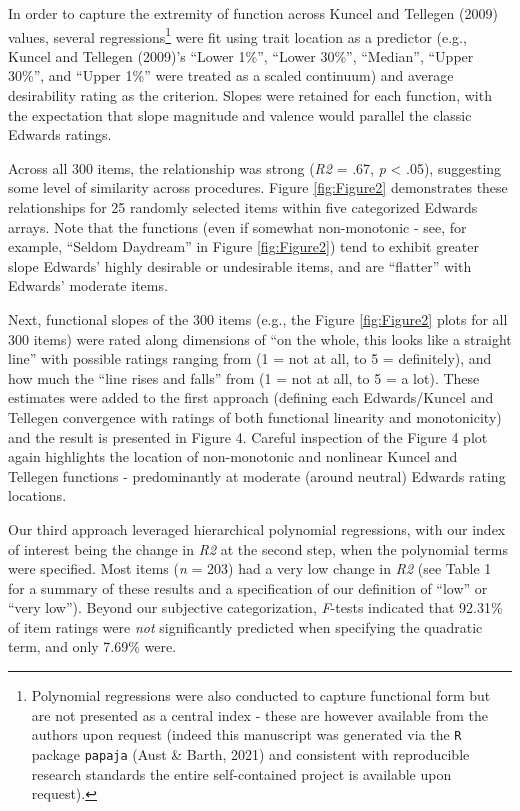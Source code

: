 \documentclass[
  ,man]{apa6}
\begin{document}
In order to capture the extremity of function across Kuncel and Tellegen (2009) values, several regressions\footnote{Polynomial regressions were also conducted to capture functional form but are not presented as a central index - these are however available from the authors upon request (indeed this manuscript was generated via the \texttt{R} package \texttt{papaja} (Aust \& Barth, 2021) and consistent with reproducible research standards the entire self-contained project is available upon request).} were fit using trait location as a predictor (e.g., Kuncel and Tellegen (2009)'s ``Lower 1\%'', ``Lower 30\%'', ``Median'', ``Upper 30\%'', and ``Upper 1\%'' were treated as a scaled continuum) and average desirability rating as the criterion. Slopes were retained for each function, with the expectation that slope magnitude and valence would parallel the classic Edwards ratings.

Across all 300 items, the relationship was strong (\emph{R2} = .67, \emph{p} \textless{} .05), suggesting some level of similarity across procedures. Figure \ref{fig:Figure2} demonstrates these relationships for 25 randomly selected items within five categorized Edwards arrays. Note that the functions (even if somewhat non-monotonic - see, for example, ``Seldom Daydream'' in Figure \ref{fig:Figure2}) tend to exhibit greater slope Edwards' highly desirable or undesirable items, and are ``flatter'' with Edwards' moderate items.

Next, functional slopes of the 300 items (e.g., the Figure \ref{fig:Figure2} plots for all 300 items) were rated along dimensions of ``on the whole, this looks like a straight line'' with possible ratings ranging from (1 = not at all, to 5 = definitely), and how much the ``line rises and falls'' from (1 = not at all, to 5 = a lot). These estimates were added to the first approach (defining each Edwards/Kuncel and Tellegen convergence with ratings of both functional linearity and monotonicity) and the result is presented in Figure 4. Careful inspection of the Figure 4 plot again highlights the location of non-monotonic and nonlinear Kuncel and Tellegen functions - predominantly at moderate (around neutral) Edwards rating locations.

Our third approach leveraged hierarchical polynomial regressions, with our index of interest being the change in \emph{R2} at the second step, when the polynomial terms were specified. Most items (\emph{n} = 203) had a very low change in \emph{R2} (see Table 1 for a summary of these results and a specification of our definition of ``low'' or ``very low''). Beyond our subjective categorization, \emph{F}-tests indicated that 92.31\% of item ratings were \emph{not} significantly predicted when specifying the quadratic term, and only 7.69\% were.
\end{document}
